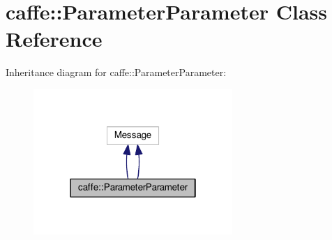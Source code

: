 \hypertarget{classcaffe_1_1_parameter_parameter}{}\section{caffe\+:\+:Parameter\+Parameter Class Reference}
\label{classcaffe_1_1_parameter_parameter}


Inheritance diagram for caffe\+:\+:Parameter\+Parameter\+:
\nopagebreak
\begin{figure}[H]
\begin{center}
\leavevmode
\includegraphics[width=214pt]{classcaffe_1_1_parameter_parameter__inherit__graph}
\end{center}
\end{figure}
